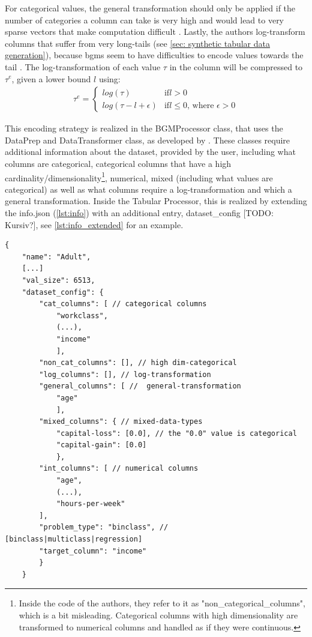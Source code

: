 For categorical values, the general transformation should only be applied if the number of categories a column can take is very high and would lead to very sparse vectors that make computation difficult \cite{zhao2022CTABGANEnhancingTabular}.
Lastly, the authors log-transform columns that suffer from very long-tails (see \autoref{sec: synthetic tabular data generation}), because \Glspl{bgm} seem to have difficulties to encode values towards the tail \cite{zhao2022CTABGANEnhancingTabular}.
The log-transformation of each value $\tau$ in the column will be compressed to $\tau^e$, given a lower bound $l$ using:
\begin{equation}
	\label{eqn:log-transform}
	\begin{align*}
		\tau^e =
		\begin{cases}
			log(\tau)            & \text{if} l>0                                 \\
			log(\tau-l+\epsilon) & \text{if} l\leq0 \text{, where } \epsilon > 0
		\end{cases}
	\end{align*}
\end{equation}

This encoding strategy is realized in the BGMProcessor class, that uses the DataPrep and DataTransformer class, as developed by \cite{zhao2022CTABGANEnhancingTabular}.
These classes require additional information about the dataset, provided by the user, including what columns are categorical, categorical columns that have a high cardinality/dimensionality\footnote[]{Inside the code of the authors, they refer to it as "non_categorical_columns", which is a bit misleading. Categorical columns with high dimensionality are transformed to numerical columns and handled as if they were continuous.}, numerical, mixed (including what values are categorical) as well as what columns require a log-transformation and which a general transformation.
Inside the Tabular Processor, this is realized by extending the info.json (\autoref{lst:info}) with an additional entry, dataset\_config [TODO: Kursiv?], see \autoref{lst:info_extended} for an example.

\begin{lstlisting}[label={lst:info_extended},caption={Example extended data info file}]
    {
    "name": "Adult",
    [...]
    "val_size": 6513,
    "dataset_config": {
        "cat_columns": [ // categorical columns
            "workclass", 
            (...), 
            "income"
            ],
        "non_cat_columns": [], // high dim-categorical
        "log_columns": [], // log-transformation
        "general_columns": [ //  general-transformation
            "age"
            ], 
        "mixed_columns": { // mixed-data-types
            "capital-loss": [0.0], // the "0.0" value is categorical           
            "capital-gain": [0.0]
            },
        "int_columns": [ // numerical columns 
            "age", 
            (...), 
            "hours-per-week"
        ],
        "problem_type": "binclass", // [binclass|multiclass|regression]
        "target_column": "income"
        }
    }
\end{lstlisting}

